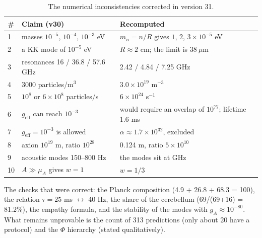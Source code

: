 \documentclass[11pt,a4paper]{article}
\begin{document}
\begin{table}[H]
\centering
\small
\begin{tabular}{@{}p{0.5cm}p{6.2cm}p{5.2cm}@{}}
\toprule
\# & \textbf{Claim (v30)} & \textbf{Recomputed} \\ \midrule
1 & masses $10^{-5}$, $10^{-4}$, $10^{-3}$ eV & $m_n = n/R$ gives $1$, $2$, $3 \times 10^{-5}$ eV \\
2 & a KK mode of $10^{-5}$ eV & $R \approx 2$ cm; the limit is $38\ \mu$m \\
3 & resonances 16 / 36.8 / 57.6 GHz & 2.42 / 4.84 / 7.25 GHz \\
4 & 3000 particles/m$^3$ & $3.0\times10^{19}$ m$^{-3}$ \\
5 & $10^8$ or $6\times10^8$ particles/s & $6\times10^{24}$ s$^{-1}$ \\
6 & $g_{\text{eff}}$ can reach $10^{-3}$ & would require an overlap of $10^{77}$; lifetime 1.6 ms \\
7 & $g_{\text{eff}} = 10^{-3}$ is allowed & $\alpha \approx 1.7\times10^{32}$, excluded \\
8 & axion $10^{19}$ m, ratio $10^{28}$ & 0.124 m, ratio $5\times10^{10}$ \\
9 & acoustic modes 150--800 Hz & the modes sit at GHz \\
10 & $A \gg \mu_A$ gives $w = 1$ & $w = 1/3$ \\ \bottomrule
\end{tabular}
\caption{The numerical inconsistencies corrected in version 31.}
\label{tab:audit}
\end{table}

The checks that were correct: the Planck composition (4.9 + 26.8 + 68.3 = 100), the relation $\tau = 25$ ms $\leftrightarrow$ 40 Hz, the share of the cerebellum (69/(69+16) = 81.2\%), the empathy formula, and the stability of the modes with $g_A \approx 10^{-80}$. What remains unprovable is the count of 313 predictions (only about 20 have a protocol) and the $\Phi$ hierarchy (stated qualitatively).
\end{document}
